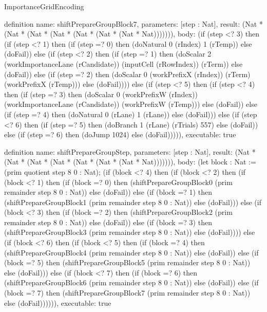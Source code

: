 \begin{lexlean}{ImportanceGridEncoding}
\begin{semanticmodule}
definition{
  name: shiftPrepareGroupBlock7,
  parameters: [step : Nat],
  result: (Nat * (Nat * (Nat * (Nat * (Nat * (Nat * (Nat * Nat))))))),
  body: (if (step <? 3) then
      (if (step <? 1) then
      (if (step =? 0) then (doNatural 0 (rIndex) 1 (rTemp)) else (doFail)) else
      (if (step <? 2) then
      (if (step =? 1) then (doScalar 2 (workImportanceLane (rCandidate)) (inputCell (rRowIndex)) (rTerm)) else (doFail)) else
      (if (step =? 2) then (doScalar 0 (workPrefixX (rIndex)) (rTerm) (workPrefixX (rTemp))) else (doFail)))) else
      (if (step <? 5) then
      (if (step <? 4) then
      (if (step =? 3) then (doScalar 0 (workPrefixW (rIndex)) (workImportanceLane (rCandidate)) (workPrefixW (rTemp))) else (doFail)) else
      (if (step =? 4) then (doNatural 0 (rLane) 1 (rLane)) else (doFail))) else
      (if (step <? 6) then
      (if (step =? 5) then (doBranch 1 (rLane) (rTrials) 557) else (doFail)) else
      (if (step =? 6) then (doJump 1024) else (doFail))))),
  executable: true
}

definition{
  name: shiftPrepareGroupStep,
  parameters: [step : Nat],
  result: (Nat * (Nat * (Nat * (Nat * (Nat * (Nat * (Nat * Nat))))))),
  body: (let block : Nat := (prim quotient step 8 0 : Nat); (if (block <? 4) then
      (if (block <? 2) then
      (if (block <? 1) then
      (if (block =? 0) then (shiftPrepareGroupBlock0 (prim remainder step 8 0 : Nat)) else (doFail)) else
      (if (block =? 1) then (shiftPrepareGroupBlock1 (prim remainder step 8 0 : Nat)) else (doFail))) else
      (if (block <? 3) then
      (if (block =? 2) then (shiftPrepareGroupBlock2 (prim remainder step 8 0 : Nat)) else (doFail)) else
      (if (block =? 3) then (shiftPrepareGroupBlock3 (prim remainder step 8 0 : Nat)) else (doFail)))) else
      (if (block <? 6) then
      (if (block <? 5) then
      (if (block =? 4) then (shiftPrepareGroupBlock4 (prim remainder step 8 0 : Nat)) else (doFail)) else
      (if (block =? 5) then (shiftPrepareGroupBlock5 (prim remainder step 8 0 : Nat)) else (doFail))) else
      (if (block <? 7) then
      (if (block =? 6) then (shiftPrepareGroupBlock6 (prim remainder step 8 0 : Nat)) else (doFail)) else
      (if (block =? 7) then (shiftPrepareGroupBlock7 (prim remainder step 8 0 : Nat)) else (doFail)))))),
  executable: true
}


\end{semanticmodule}
\end{lexlean}
